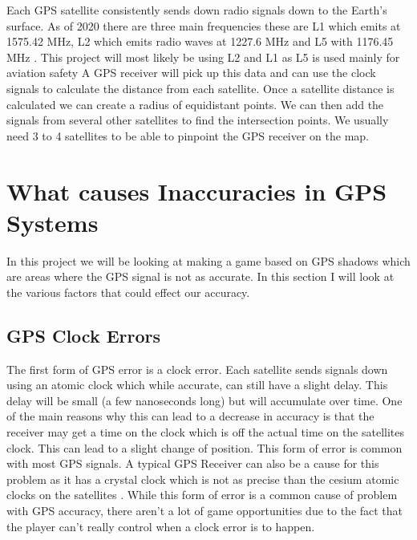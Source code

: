 \documentclass{l4proj}
\begin{document}
Each GPS satellite consistently sends down radio signals down to the Earth's surface. As of 2020 there are three main frequencies
these are L1 which emits at 1575.42 MHz, L2 which emits radio waves at 1227.6 MHz and L5 with 1176.45 MHz \citep{spsStandard}. This project
will most likely be using L2 and L1 as L5 is used mainly for aviation safety \citep{Xu2016} A GPS receiver will pick up this data and can use the clock signals to calculate the distance from each satellite. Once a 
satellite distance is calculated we can create a radius of equidistant points. We can then add the signals from several other
satellites to find the intersection points. We usually need 3 to 4 satellites to be able to pinpoint the GPS receiver on the map. \citep{Rabbany2006}




\section{What causes Inaccuracies in GPS Systems}
In this project we will be looking at making a game based on GPS shadows which are areas where the GPS signal is not as accurate. In this section I will look
at the various factors that could effect our accuracy.

\subsection{GPS Clock Errors}

The first form of GPS error is a clock error. Each satellite sends signals down using an atomic clock which while accurate, can still have a 
slight delay. This delay will be small (a few nanoseconds long) but will accumulate over time. One of the main reasons why this can lead to
a decrease in accuracy is that the receiver may get a time on the clock which is off the actual time on the satellites clock. This can lead to
a slight change of position. This form of error is common with most GPS signals. A typical GPS Receiver can also be a cause for this problem as it 
has a crystal clock which is not as precise than the cesium atomic clocks on the satellites \citep{Rabbany2006, Kleusberg1990}. While this
form of error is a common cause of problem with GPS accuracy, there aren't a lot of game opportunities due to the fact that the player
can't really control when a clock error is to happen.
\end{document}
